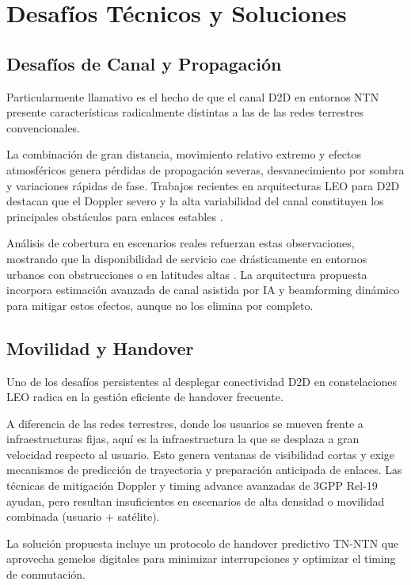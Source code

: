 \section{Desafíos Técnicos y Soluciones}

\subsection{Desafíos de Canal y Propagación}

Particularmente llamativo es el hecho de que el canal D2D en entornos NTN presente características radicalmente distintas a las de las redes terrestres convencionales. 

La combinación de gran distancia, movimiento relativo extremo y efectos atmosféricos genera pérdidas de propagación severas, desvanecimiento por sombra y variaciones rápidas de fase. Trabajos recientes en arquitecturas LEO para D2D destacan que el Doppler severo y la alta variabilidad del canal constituyen los principales obstáculos para enlaces estables \cite{DeGaudenzi2026_NTN}. 

Análisis de cobertura en escenarios reales refuerzan estas observaciones, mostrando que la disponibilidad de servicio cae drásticamente en entornos urbanos con obstrucciones o en latitudes altas \cite{Ullah2026_D2D}. La arquitectura propuesta incorpora estimación avanzada de canal asistida por IA y beamforming dinámico para mitigar estos efectos, aunque no los elimina por completo.

\subsection{Movilidad y Handover}

Uno de los desafíos persistentes al desplegar conectividad D2D en constelaciones LEO radica en la gestión eficiente de handover frecuente. 

A diferencia de las redes terrestres, donde los usuarios se mueven frente a infraestructuras fijas, aquí es la infraestructura la que se desplaza a gran velocidad respecto al usuario. Esto genera ventanas de visibilidad cortas y exige mecanismos de predicción de trayectoria y preparación anticipada de enlaces. Las técnicas de mitigación Doppler y timing advance avanzadas de 3GPP Rel-19 ayudan, pero resultan insuficientes en escenarios de alta densidad o movilidad combinada (usuario + satélite).

La solución propuesta incluye un protocolo de handover predictivo TN-NTN que aprovecha gemelos digitales para minimizar interrupciones y optimizar el timing de conmutación.

